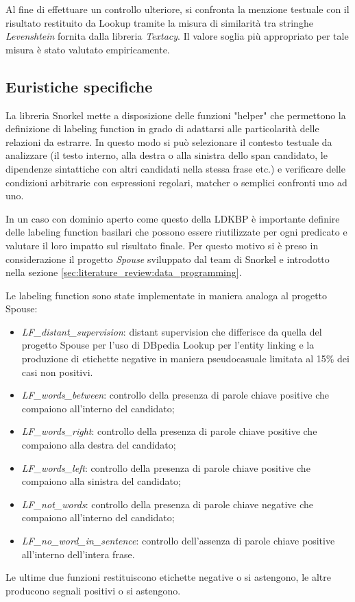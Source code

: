 Al fine di effettuare un controllo ulteriore, si confronta la menzione testuale con il risultato restituito da Lookup tramite la misura di similarità tra stringhe \textit{Levenshtein} fornita dalla libreria \textit{Textacy}. Il valore soglia più appropriato per tale misura è stato valutato empiricamente.

\subsection{Euristiche specifiche}
\label{sec:methods:labelling:heuristic}  

La libreria Snorkel mette a disposizione delle funzioni "helper" che permettono la definizione di labeling function in grado di adattarsi alle particolarità delle relazioni da estrarre. In questo modo si può selezionare il contesto testuale da analizzare (il testo interno, alla destra o alla sinistra dello span candidato, le dipendenze sintattiche con altri candidati nella stessa frase etc.) e verificare delle condizioni arbitrarie con espressioni regolari, matcher o semplici confronti uno ad uno.

In un caso con dominio aperto come questo della LDKBP è importante definire delle labeling function basilari che possono essere riutilizzate per ogni predicato e valutare il loro impatto sul risultato finale. Per questo motivo si è preso in considerazione il progetto \textit{Spouse}\cite{snorkel_spouse_result_lfs} sviluppato dal team di Snorkel e introdotto nella sezione \ref{sec:literature_review:data_programming}.

Le labeling function sono state implementate in maniera analoga al progetto Spouse:
\begin{itemize}
\item \textit{LF\_distant\_supervision}: distant supervision che differisce da quella del progetto Spouse per l'uso di DBpedia Lookup per l'entity linking e la produzione di etichette negative in maniera pseudocasuale limitata al 15\% dei casi non positivi.
\item \textit{LF\_words\_between}: controllo della presenza di parole chiave positive che compaiono all'interno del candidato;
\item \textit{LF\_words\_right}: controllo della presenza di parole chiave positive che compaiono alla destra del candidato;
\item \textit{LF\_words\_left}: controllo della presenza di parole chiave positive che compaiono alla sinistra del candidato;
\item \textit{LF\_not\_words}: controllo della presenza di parole chiave negative che compaiono all'interno del candidato;
\item \textit{LF\_no\_word\_in\_sentence}: controllo dell'assenza di parole chiave positive all'interno dell'intera frase. 
\end{itemize}
Le ultime due funzioni restituiscono etichette negative o si astengono, le altre producono segnali positivi o si astengono.


